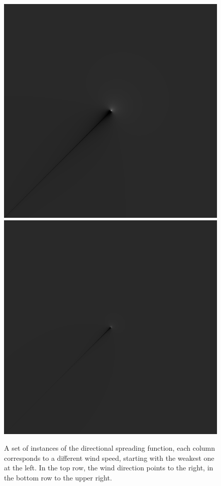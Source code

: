 \begin{figure}
 {
 \includegraphics[scale=0.25]{figures/dfilt_wur_sqrt50.png}
 }
 \hfill
 \subtop
 {
 \includegraphics[scale=0.25]{figures/dfilt_wur_sqrt200.png}
 }
\caption{A set of instances of the directional spreading function, each column 
corresponds to a different wind speed, starting with the weakest one at the 
left. In the top row, the wind direction points to the right, in the bottom row 
to the upper right.}
\label{fig:directional_filter}
\end{figure}

